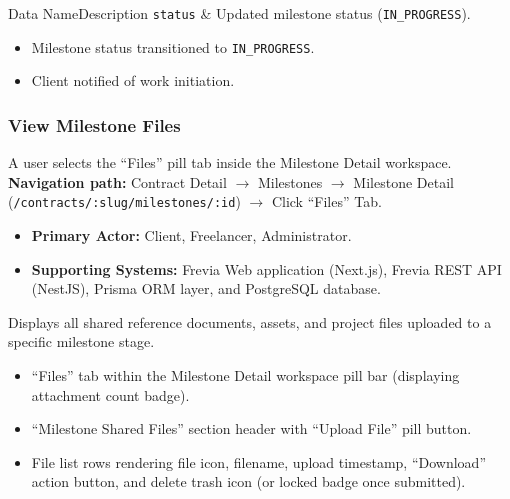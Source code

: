 \begin{specdatatable}{Data Name}{Description}
      \texttt{status} & Updated milestone status (\texttt{IN\_PROGRESS}).\\ \hline
\end{specdatatable}

\begin{itemize}[leftmargin=1.6em,topsep=3pt,itemsep=2pt,parsep=0pt,label=$\bullet$]
      \item Milestone status transitioned to \texttt{IN\_PROGRESS}.
      \item Client notified of work initiation.
\end{itemize}

\subsubsection{ View Milestone Files}

A user selects the ``Files'' pill tab inside the Milestone Detail workspace.\newline
\textbf{Navigation path:} Contract Detail $\rightarrow$ Milestones $\rightarrow$ Milestone Detail (\texttt{/contracts/:slug/milestones/:id}) $\rightarrow$ Click ``Files'' Tab.


\begin{itemize}[leftmargin=1.6em,topsep=3pt,itemsep=2pt,parsep=0pt,label=$\bullet$]
      \item \textbf{Primary Actor:} Client, Freelancer, Administrator.
      \item \textbf{Supporting Systems:} Frevia Web application (Next.js), Frevia REST API (NestJS), Prisma ORM layer, and PostgreSQL database.
\end{itemize}

\noindent Displays all shared reference documents, assets, and project files uploaded to a specific milestone stage.

\begin{itemize}[leftmargin=1.6em,topsep=3pt,itemsep=2pt,parsep=0pt,label=$\bullet$]
      \item ``Files'' tab within the Milestone Detail workspace pill bar (displaying attachment count badge).
      \item ``Milestone Shared Files'' section header with ``Upload File'' pill button.
      \item File list rows rendering file icon, filename, upload timestamp, ``Download'' action button, and delete trash icon (or locked badge once submitted).
\end{itemize}

